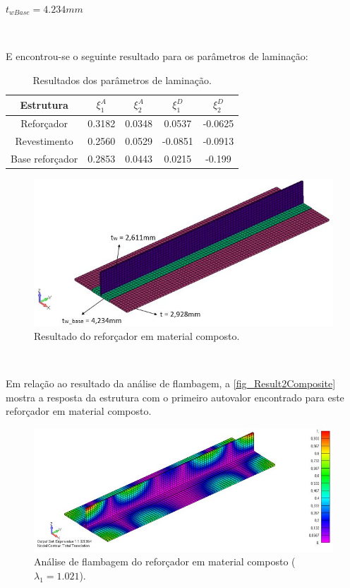 \centerline{$t_{wBase} = 4.234 mm$}\

E encontrou-se o seguinte resultado para os parâmetros de laminação:\

\begin{table}[h]
\centering
\begin{tabular}{ccccc}
\toprule
Estrutura & $\xi^A_{1}$ & $\xi^A_{2}$ & $\xi^D_{1}$ & $\xi^D_{2}$ \\ \midrule
Reforçador & 0.3182 & 0.0348 & 0.0537 & -0.0625\\
Revestimento & 0.2560 & 0.0529 & -0.0851 & -0.0913\\
Base reforçador & 0.2853 & 0.0443 & 0.0215 & -0.199\\
\bottomrule
\end{tabular}
\caption{Resultados dos parâmetros de laminação.}
\label{tbl:result_qsis}
\end{table}


\begin{figure}[ht]
 \caption{\label{fig_Result1Composite}Resultado do reforçador em material composto.}
 \centering
 \includegraphics[scale=0.8]{figura/Results_Composite}
\end{figure}
\

Em relação ao resultado da análise de flambagem, a \autoref{fig_Result2Composite} mostra a resposta da estrutura com o primeiro autovalor encontrado para este reforçador em material composto.

\begin{figure}[ht]
 \caption{\label{fig_Result2Composite}Análise de flambagem do reforçador em material composto ($\lambda_1 = 1.021$).}
 \centering
 \includegraphics[scale=0.85]{figura/Results2_Composite}
\end{figure}
\

